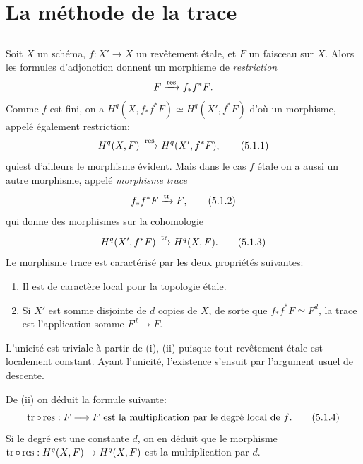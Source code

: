 \documentclass[10pt]{../fichiers-configuration-latex/smfart}
\begin{document}
\section{La méthode de la trace}

\subsection{}
Soit $X$ un schéma, $f:X'\rightarrow X$ un revêtement étale, et $F$ un
faisceau sur $X$. Alors les formules d'adjonction donnent un morphisme
de \emph{restriction}
$$
F\xrightarrow{\operatorname{res}}f_{\ast}f^{\ast}F{}.
$$
Comme $f$ est fini, on a $H^q(X,f_{\ast}f^{\ast}F)\simeq H^q(X',
f^{\ast}F)$ d'où un morphisme, appelé également restriction:
\begin{equation*}
H^q(X,F)\xrightarrow{\operatorname{res}}H^q(X',f^{\ast} F){},\tag{5.1.1}
\end{equation*}
qui\pageoriginale est d'ailleurs le morphisme évident. Mais dans le
cas $f$ étale on a aussi un autre morphisme, appelé \emph{morphisme
trace}
\begin{equation*}
f_{\ast}f^{\ast} F\xrightarrow{\operatorname{tr}} F{},\tag{5.1.2}
\end{equation*}
qui donne des morphismes sur la cohomologie
\begin{equation*}
H^q(X', f^{\ast} F)\xrightarrow{\operatorname{tr}}H^q
(X,F){}.\tag{5.1.3}
\end{equation*}
Le morphisme trace est caractérisé par les deux propriétés suivantes:
\begin{enumerate}
\renewcommand{\theenumi}{\roman{enumi}}
\renewcommand{\labelenumi}{(\theenumi)}
\item Il est de caractère local pour la topologie étale.

\item Si $X'$ est somme disjointe de $d$ copies de $X$, de sorte que
$f_{\ast}f^{\ast} F\simeq F^d$, la trace est l'application somme
$F^d\rightarrow F$.
\end{enumerate}

L'unicité est triviale à partir de (i), (ii) puisque tout revêtement
étale est localement constant. Ayant l'unicité, l'existence s'ensuit
par l'argument usuel de descente.

De (ii) on déduit la formule suivante:
\begin{equation*}
\operatorname{tr}\circ \operatorname{res}:F\longrightarrow F\mbox{ est la multiplication par le
degré local de $f$.}\tag{5.1.4}
\end{equation*}
Si le degré est une constante $d$, on en déduit que le morphisme
$\operatorname{tr}\circ \operatorname{res}: H^q(X,F)\rightarrow H^q(X,F)$ est la multiplication
par $d$.
\end{document}
